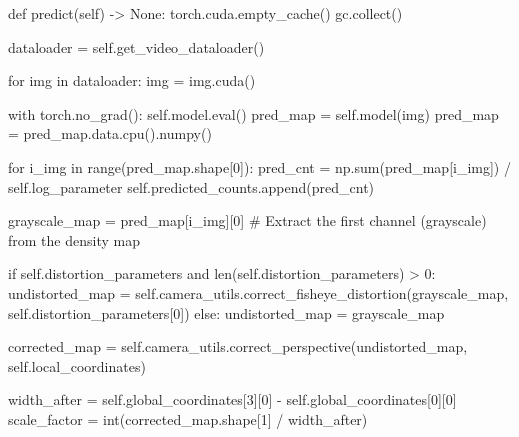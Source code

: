 \documentclass[
]{article}
\newenvironment{Shaded}{\begin{snugshade}}{\end{snugshade}}
\newcommand{\BuiltInTok}[1]{\textcolor[rgb]{0.00,0.23,0.31}{#1}}
\newcommand{\CommentTok}[1]{\textcolor[rgb]{0.37,0.37,0.37}{#1}}
\newcommand{\ControlFlowTok}[1]{\textcolor[rgb]{0.00,0.23,0.31}{#1}}
\newcommand{\DecValTok}[1]{\textcolor[rgb]{0.68,0.00,0.00}{#1}}
\newcommand{\KeywordTok}[1]{\textcolor[rgb]{0.00,0.23,0.31}{#1}}
\newcommand{\NormalTok}[1]{\textcolor[rgb]{0.00,0.23,0.31}{#1}}
\newcommand{\OperatorTok}[1]{\textcolor[rgb]{0.37,0.37,0.37}{#1}}
\newcommand{\VariableTok}[1]{\textcolor[rgb]{0.07,0.07,0.07}{#1}}
\begin{document}
\begin{Shaded}
\begin{Highlighting}[]
\KeywordTok{def}\NormalTok{ predict(}\VariableTok{self}\NormalTok{) }\OperatorTok{{-}\textgreater{}} \VariableTok{None}\NormalTok{:}
\NormalTok{torch.cuda.empty\_cache()}
\NormalTok{gc.collect()}

\NormalTok{dataloader }\OperatorTok{=} \VariableTok{self}\NormalTok{.get\_video\_dataloader()}

\ControlFlowTok{for}\NormalTok{ img }\KeywordTok{in}\NormalTok{ dataloader:}
\NormalTok{  img }\OperatorTok{=}\NormalTok{ img.cuda()}

  \ControlFlowTok{with}\NormalTok{ torch.no\_grad():}
    \VariableTok{self}\NormalTok{.model.}\BuiltInTok{eval}\NormalTok{()}
\NormalTok{    pred\_map }\OperatorTok{=} \VariableTok{self}\NormalTok{.model(img)}
\NormalTok{  pred\_map }\OperatorTok{=}\NormalTok{ pred\_map.data.cpu().numpy()}

  \ControlFlowTok{for}\NormalTok{ i\_img }\KeywordTok{in} \BuiltInTok{range}\NormalTok{(pred\_map.shape[}\DecValTok{0}\NormalTok{]):}
\NormalTok{    pred\_cnt }\OperatorTok{=}\NormalTok{ np.}\BuiltInTok{sum}\NormalTok{(pred\_map[i\_img]) }\OperatorTok{/} \VariableTok{self}\NormalTok{.log\_parameter}
    \VariableTok{self}\NormalTok{.predicted\_counts.append(pred\_cnt)}

\NormalTok{    grayscale\_map }\OperatorTok{=}\NormalTok{ pred\_map[i\_img][}\DecValTok{0}\NormalTok{] }\CommentTok{\# Extract the first channel (grayscale) from the density map}

    \ControlFlowTok{if} \VariableTok{self}\NormalTok{.distortion\_parameters }\KeywordTok{and} \BuiltInTok{len}\NormalTok{(}\VariableTok{self}\NormalTok{.distortion\_parameters) }\OperatorTok{\textgreater{}} \DecValTok{0}\NormalTok{:}
\NormalTok{      undistorted\_map }\OperatorTok{=} \VariableTok{self}\NormalTok{.camera\_utils.correct\_fisheye\_distortion(grayscale\_map, }\VariableTok{self}\NormalTok{.distortion\_parameters[}\DecValTok{0}\NormalTok{])}
    \ControlFlowTok{else}\NormalTok{:}
\NormalTok{      undistorted\_map }\OperatorTok{=}\NormalTok{ grayscale\_map}

\NormalTok{    corrected\_map }\OperatorTok{=} \VariableTok{self}\NormalTok{.camera\_utils.correct\_perspective(undistorted\_map, }\VariableTok{self}\NormalTok{.local\_coordinates)}

\NormalTok{    width\_after }\OperatorTok{=} \VariableTok{self}\NormalTok{.global\_coordinates[}\DecValTok{3}\NormalTok{][}\DecValTok{0}\NormalTok{] }\OperatorTok{{-}} \VariableTok{self}\NormalTok{.global\_coordinates[}\DecValTok{0}\NormalTok{][}\DecValTok{0}\NormalTok{]}
\NormalTok{    scale\_factor }\OperatorTok{=} \BuiltInTok{int}\NormalTok{(corrected\_map.shape[}\DecValTok{1}\NormalTok{] }\OperatorTok{/}\NormalTok{ width\_after)}


\end{Highlighting}
\end{Shaded}
\end{document}
